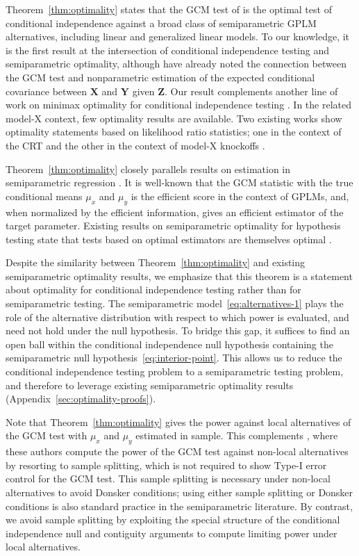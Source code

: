 \documentclass[12pt]{article}
\theoremstyle{definition}
\theoremstyle{remark}
\newcommand{\prx}{\bm X}								%
\newcommand{\prz}{\bm Z}								%
\newcommand{\pry}{{\bm Y}}								%
\begin{document}
	Theorem~\ref{thm:optimality} states that the GCM test of \citet{Shah2018} is the optimal test of conditional independence against a broad class of semiparametric GPLM alternatives, including linear and generalized linear models. To our knowledge, it is the first result at the intersection of conditional independence testing and semiparametric optimality, although \citet{Shah2018} have already noted the connection between the GCM test and nonparametric estimation of the expected conditional covariance between $\prx$ and $\pry$ given $\prz$. Our result complements another line of work on minimax optimality for conditional independence testing \citep{Canonne2018, Neykov2021, Kim2021}. In the related model-X context, few optimality results are available. Two existing works show optimality statements based on likelihood ratio statistics; one in the context of the CRT \citep{Katsevich2020a} and the other in the context of model-X knockoffs \citep{Spector2022a}.
	
	Theorem~\ref{thm:optimality} closely parallels results on estimation in semiparametric regression \citep{Robinson1988, Bickel1993,Donald1994, Hardle2000, Robins2001, VanDeGeer2014, Ning2017, Jankova2018a, Chernozhukov2018}. It is well-known that the GCM statistic with the true conditional means $\mu_x$ and $\mu_y$ is the efficient score in the context of GPLMs, and, when normalized by the efficient information, gives an efficient estimator of the target parameter. Existing results on semiparametric optimality for hypothesis testing state that tests based on optimal estimators are themselves optimal \citep{Choi1996, VDV1998, Kosorok2008}.
	
	Despite the similarity between Theorem~\ref{thm:optimality} and existing semiparametric optimality results, we emphasize that this theorem is a statement about optimality for conditional independence testing rather than for semiparametric testing. The semiparametric model~\eqref{eq:alternatives-1} plays the role of the alternative distribution with respect to which power is evaluated, and need not hold under the null hypothesis. To bridge this gap, it suffices to find an open ball within the conditional independence null hypothesis containing the semiparametric null hypothesis~\eqref{eq:interior-point}. This allows us to reduce the conditional independence testing problem to a semiparametric testing problem, and therefore to leverage existing semiparametric optimality results (Appendix~\ref{sec:optimality-proofs}).
	
	Note that Theorem~\ref{thm:optimality} gives the power against local alternatives of the GCM test with $\mu_x$ and $\mu_y$ estimated in sample. This complements \citet[Theorem 8]{Shah2018}, where these authors compute the power of the GCM test against non-local alternatives by resorting to sample splitting, which is not required to show Type-I error control for the GCM test. This sample splitting is necessary under non-local alternatives to avoid Donsker conditions; using either sample splitting or Donsker conditions is also standard practice in the semiparametric literature. By contrast, we avoid sample splitting by exploiting the special structure of the conditional independence null and contiguity arguments to compute limiting power under local alternatives.
	
\end{document}
